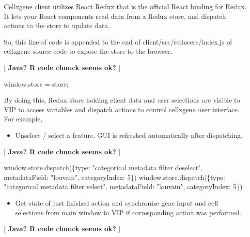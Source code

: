 \documentclass[
]{article}
\newenvironment{Shaded}{\begin{snugshade}}{\end{snugshade}}
\newcommand{\DecValTok}[1]{\textcolor[rgb]{0.00,0.00,0.81}{#1}}
\newcommand{\FunctionTok}[1]{\textcolor[rgb]{0.00,0.00,0.00}{#1}}
\newcommand{\NormalTok}[1]{#1}
\newcommand{\OtherTok}[1]{\textcolor[rgb]{0.56,0.35,0.01}{#1}}
\newcommand{\SpecialCharTok}[1]{\textcolor[rgb]{0.00,0.00,0.00}{#1}}
\newcommand{\StringTok}[1]{\textcolor[rgb]{0.31,0.60,0.02}{#1}}
\providecommand{\tightlist}{%
  \setlength{\itemsep}{0pt}\setlength{\parskip}{0pt}}
\begin{document}
Cellxgene client utilizes React Redux that is the official React binding for Redux. It lets your React components read data from a Redux store, and dispatch actions to the store to update data.

So, this line of code is appended to the end of client/src/reducers/index.js of cellxgene source code to expose the store to the browser.

{[}
\textbf{
Java? R code chunck seems ok?
}{]}

\begin{Shaded}
\begin{Highlighting}[]
\NormalTok{window.store }\OtherTok{=}\NormalTok{ store;}
\end{Highlighting}
\end{Shaded}

By doing this, Redux store holding client data and user selections are visible to VIP to access variables and dispatch actions to control cellxgene user interface. For example,

\begin{itemize}
\tightlist
\item
  Unselect / select a feature. GUI is refreshed automatically after dispatching.
\end{itemize}

{[}
\textbf{
Java? R code chunck seems ok?
}{]}

\begin{Shaded}
\begin{Highlighting}[]
\FunctionTok{window.store.dispatch}\NormalTok{(\{type}\SpecialCharTok{:} \StringTok{"categorical metadata filter deselect"}\NormalTok{, metadataField}\SpecialCharTok{:} \StringTok{"louvain"}\NormalTok{, categoryIndex}\SpecialCharTok{:} \DecValTok{5}\NormalTok{\})}
\FunctionTok{window.store.dispatch}\NormalTok{(\{type}\SpecialCharTok{:} \StringTok{"categorical metadata filter select"}\NormalTok{, metadataField}\SpecialCharTok{:} \StringTok{"louvain"}\NormalTok{, categoryIndex}\SpecialCharTok{:} \DecValTok{5}\NormalTok{\})}
\end{Highlighting}
\end{Shaded}

\begin{itemize}
\tightlist
\item
  Get state of just finished action and synchronize gene input and cell selections from main window to VIP if corresponding action was performed.
\end{itemize}

{[}
\textbf{
Java? R code chunck seems ok?
}{]}
\end{document}
